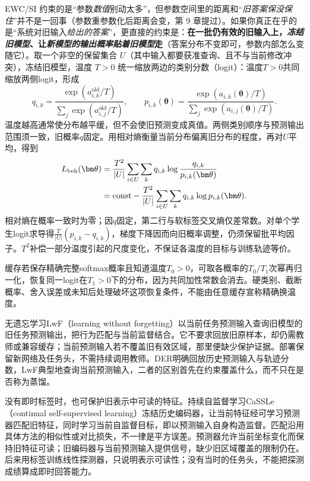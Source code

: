 EWC/SI 约束的是“参数\emph{数值}别动太多”，但参数空间里的距离和“\emph{旧答案保没保住}”并不是一回事（参数重参数化后距离会变，第 9 章提过）。如果你真正在乎的是“系统对旧输入\emph{给出的答案}”，更直接的约束是：\textbf{在一批仍有效的旧输入上，\emph{冻结旧模型}、让\emph{新模型的输出概率\emph{贴着}旧模型}走}（答案分布不变即可，参数内部怎么变随它）。取一个非空的保留集合 $U$（其中输入都要获准查询、且不与当前修改冲突），冻结旧模型，温度 $T>0$ 统一缩放两边的类别分数（logit）：温度$T>0$共同缩放两侧logit，形成
\[
q_{i,k}=\frac{\exp(a^{\mathrm{old}}_{i,k}/T)}
{\sum_j\exp(a^{\mathrm{old}}_{i,j}/T)},\qquad
p_{i,k}(\bm\theta)=\frac{\exp(a_{i,k}(\bm\theta)/T)}
{\sum_j\exp(a_{i,j}(\bm\theta)/T)}.
\]
温度越高通常使分布越平缓，但不会使旧预测变成真值。两侧类别顺序与预测输出范围须一致，旧概率$q$固定。用相对熵衡量当前分布偏离旧分布的程度，再对$U$平均，得到
\begin{align}
L_{\mathrm{beh}}(\bm\theta)
&=\frac{T^2}{|U|}\sum_{i\in U}\sum_k
q_{i,k}\log\frac{q_{i,k}}{p_{i,k}(\bm\theta)}\notag\\
&=\mathrm{const}
-\frac{T^2}{|U|}\sum_{i\in U}\sum_k q_{i,k}\log p_{i,k}(\bm\theta).
\label{eq:ket-update-behavior}
\end{align}
相对熵在概率一致时为零；因$q$固定，第二行与软标签交叉熵仅差常数。对单个学生logit求导得$\frac{T}{|U|}(p_{i,k}-q_{i,k})$，梯度下降因而向旧概率调整，仍须保留批平均因子。$T^2$补偿一部分温度引起的尺度变化，不保证各温度的目标与训练轨迹等价。

缓存若保存精确完整softmax概率且知道温度$T_0>0$，可取各概率的$T_0/T_1$次幂再归一化，恢复同一logit在$T_1>0$下的分布，因为共同加性常数会消去。硬类别、截断概率、舍入误差或未知后处理破坏这项恢复条件，不能由任意缓存宣称精确换温度。

无遗忘学习LwF（learning without forgetting）以当前任务预测输入查询旧模型的旧任务预测输出，把行为匹配与当前监督结合。它不要求回放旧原样本，却仍需教师或兼容缓存；当前预测输入若不覆盖旧有效区域，那里便缺少保护证据。部署保留新网络及任务头，不需持续调用教师。DER明确回放历史预测输入与轨迹分数，LwF典型地查询当前预测输入，二者的区别首先在约束覆盖什么，而不只在是否称为蒸馏。

没有即时标签时，也可保护旧表示中可读的特征。持续自监督学习CaSSLe（continual self-supervised learning）冻结历史编码器，让当前特征经可学习预测器匹配旧特征，同时学习当前自监督目标，即以预测输入自身构造监督。匹配沿用具体方法的相似性或对比损失，不一律是平方误差。预测器允许当前坐标变化而保持旧特征可读；旧编码器与当前预测输入提供信号，缺少旧区域覆盖的限制仍在。后来用标签训练线性探测器，只说明表示可读性；没有当时的任务头，不能把探测成绩算成即时回答能力。

